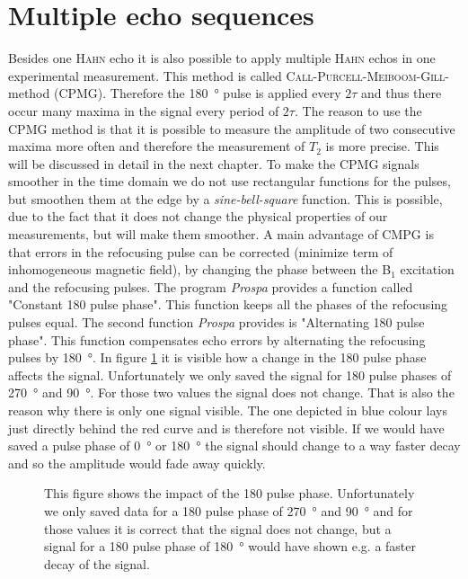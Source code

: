 \section{Multiple echo sequences}
\label{sec:Multipleechosequences}
Besides one \textsc{Hahn} echo it is also possible to apply multiple \textsc{Hahn} echos in one experimental measurement.
This method is called \textsc{Call-Purcell-Meiboom-Gill}-method (CPMG).
Therefore the \SI{180}{\degree} pulse is applied every $2\tau$ and thus there occur many maxima in the signal every period of $2\tau$.
The reason to use the CPMG method is that it is possible to measure the amplitude of two consecutive maxima more often and therefore the measurement of $T_2$ is more precise.
This will be discussed in detail in the next chapter.\newline
To make the CPMG signals smoother in the time domain we do not use rectangular functions for the pulses, but smoothen them at the edge by a \textit{sine-bell-square} function.
This is possible, due to the fact that it does not change the physical properties of our measurements, but will make them smoother.\newline
A main advantage of CMPG is that errors in the refocusing pulse can be corrected (minimize term of inhomogeneous magnetic field), by changing the phase between the B$_1$ excitation and the refocusing pulses.
The program \textit{Prospa} provides a function called "Constant 180 pulse phase".
This function keeps all the phases of the refocusing pulses equal.
The second function \textit{Prospa} provides is "Alternating 180 pulse phase".
This function compensates echo errors by alternating the refocusing pulses by \SI{180}{\degree}.
In figure \ref{fig:180pulsephasedegree} it is visible how a change in the 180 pulse phase affects the signal.
Unfortunately we only saved the signal for 180 pulse phases of \SI{270}{\degree} and \SI{90}{\degree}.
For those two values the signal does not change. That is also the reason why there is only one signal visible.
The one depicted in blue colour lays just directly behind the red curve and is therefore not visible.
If we would have saved a pulse phase of \SI{0}{\degree} or \SI{180}{\degree} the signal should change to a way faster decay and so the amplitude would fade away quickly.

\begin{figure}[H]
    \centering
    
    \caption[This figure shows the impact of the 180 pulse phase.]{This figure shows the impact of the 180 pulse phase.
    Unfortunately we only saved data for a 180 pulse phase of \SI{270}{\degree} and \SI{90}{\degree} and for those values it is correct that the signal does not change, but a signal for a 180 pulse phase of \SI{180}{\degree} would have shown e.g. a faster decay of the signal.}
    \label{fig:180pulsephasedegree}
\end{figure}